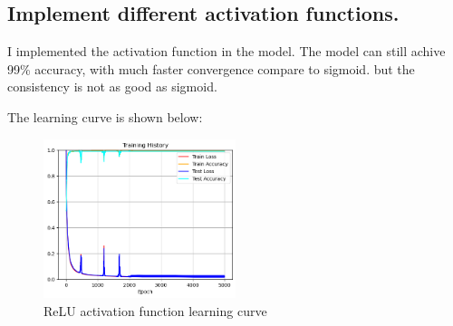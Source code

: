 \documentclass{homework}
\begin{document}
\subsection{Implement different activation functions.}

I implemented the  activation function in the model. The model can still achive 99\% accuracy, with much faster convergence compare to sigmoid. but the consistency is not as good as sigmoid.

The learning curve is shown below:

\begin{figure}[H]
    \centering
    \includegraphics[width=0.5\textwidth]{linear_relu_curve.png}
    \caption{ReLU activation function learning curve}
\end{figure}
\end{document}
